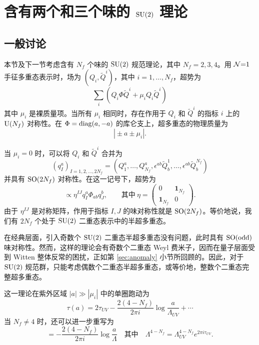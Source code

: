 \section{含有两个和三个味的 $\mathop{\mathrm{SU}}(2)$ 理论}\label{sec:nf=2,3}
\subsection{一般讨论}
本节及下一节考虑含有 $N_f$ 个味的 $\mathop{\mathrm{SU}}(2)$ 规范理论，其中 $N_f=2,3,4$。用 $\mathcal{N}{=}1$ 手征多重态表示时，场为 $(Q_i,\tilde Q^i)$，其中 $i=1,\ldots,N_f$，超势为
\begin{equation}
\sum_i\left(Q_i\Phi\tilde Q^i+\mu_iQ_i\tilde Q^i\right)
\end{equation}
其中 $\mu_i$ 是裸质量项。当所有 $\mu_i$ 相同时，存在作用于 $Q_i$ 和 $\tilde Q^i$ 的指标 $i$ 上的 ${\mathrm{U}}(N_f)$ 对称性。在 $\Phi=\mathop{\mathrm{diag}}(a,-a)$ 的库仑支上，超多重态的物理质量为
\begin{equation}
|{}\pm a\pm\mu_i|.
\end{equation}

当 $\mu_i=0$ 时，可以将 $Q_i$ 和 $\tilde Q^i$ 合并为
\begin{equation}
(q_I^a)_{I=1,2,\ldots,2N_f}=(Q_1^a,\ldots,Q_{N_f}^a,\epsilon^{ab}\tilde Q^1_b,\ldots,\epsilon^{ab}\tilde Q^{N_f}_b)
\end{equation}
并具有 $\mathop{\mathrm{SO}}(2N_f)$ 对称性。在这一记号下，超势为
\begin{equation}
\propto\eta^{IJ}q_I^a\Phi_{ab}q_J^b,\qquad
\text{其中}\ \eta=\left(
\begin{array}{c|c}
0&\mathbf{1}_{N_f}\\\hline
\mathbf{1}_{N_f}&0
\end{array}\right).
\end{equation}
由于 $\eta^{IJ}$ 是对称矩阵，作用于指标 $I,J$ 的味对称性就是 $\mathop{\mathrm{SO}}(2N_f)$。等价地说，我们有 $2N_f$ 个处于 $\mathop{\mathrm{SU}}(2)$ 二重态表示中的半超多重态。

在经典层面，引入奇数个 $\mathop{\mathrm{SU}}(2)$ 二重态半超多重态没有问题，此时具有 $\mathop{\mathrm{SO}}(\text{odd})$ 味对称性。然而，这样的理论会有奇数个二重态 Weyl 费米子，因而在量子层面受到 Witten 整体反常的困扰，正如第 \ref{sec:anomaly} 小节所回顾的。因此，对于 $\mathop{\mathrm{SU}}(2)$ 规范群，只能考虑偶数个二重态半超多重态，或等价地，整数个二重态完整超多重态。

这一理论在紫外区域 $|a|\gg|\mu_i|$ 中的单圈跑动为
\begin{equation}
\tau(a)=2\tau_{UV}-\frac{2(4-N_f)}{2\pi i}\log\frac{a}{\Lambda_{UV}}+\cdots\label{su2running}
\end{equation}
当 $N_f\neq4$ 时，还可以进一步重写为
\begin{equation}
=-\frac{2(4-N_f)}{2\pi i}\log\frac{a}{\Lambda}\label{general_1_loop}
\quad\text{其中}\quad
\Lambda^{4-N_f}=\Lambda_{UV}^{4-N_f}e^{2\pi i\tau_{UV}}.
\end{equation}

